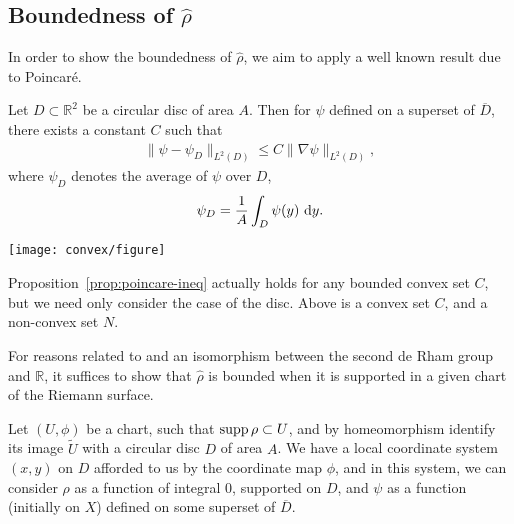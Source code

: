 \subsection{Boundedness of $ \hat{\rho} $}
In order to show the boundedness of $ \hat{\rho} $, we aim to apply a well known
result due to Poincar\'e.

\begin{proposition}\label{prop:poincare-ineq}
	Let $ D \subset \mathbb{R}^{2} $ be a circular disc of area $ A $. Then for $
		\psi $ defined on a superset of $ \overline{D} $, there exists a constant $ C
	$ such that
	\begin{align*}
		\| \psi - \psi_D \|_{L^2 ( D )} \leq C \| \nabla \psi \|_{L^2 ( D )},
	\end{align*}
	where $ \psi_D $ denotes the average of $ \psi $ over $ D $,
	\begin{align*}
		\psi_D = \frac{1}{A}\int_{D}{\psi ( y )}\operatorname{\, d\!}{y}.
	\end{align*}
\end{proposition}

\begin{marginfigure}
	\centering
	\texttt{[image: convex/figure]}
	\caption{Proposition~\ref{prop:poincare-ineq} actually holds for any bounded
		convex set $ C $, but we need only consider the case of the disc. Above is a
		convex set $ C $, and a non-convex set $ N $.}
\end{marginfigure}


\begin{remark}
	For reasons related to  and an isomorphism between
	the second de Rham group and $ \mathbb{R} $, it suffices to show that $
		\hat{\rho} $ is bounded when it is supported in a given chart of the Riemann
	surface\sidenotemark.
\end{remark}

Let $ (U, \phi) $ be a chart, such that $ \operatorname{supp} \rho \subset U $, and by
homeomorphism identify its image $ \tilde{U} $ with a circular disc $ D $ of
area $ A $. We have a local coordinate system $ ( x,y ) $ on $ D $ afforded to
us by the coordinate map $ \phi $, and in this system, we can consider $ \rho $
as a function of integral $ 0 $, supported on $ D $, and $ \psi $ as a function
(initially on $ X $) defined on some superset of $ \overline{D} $.

